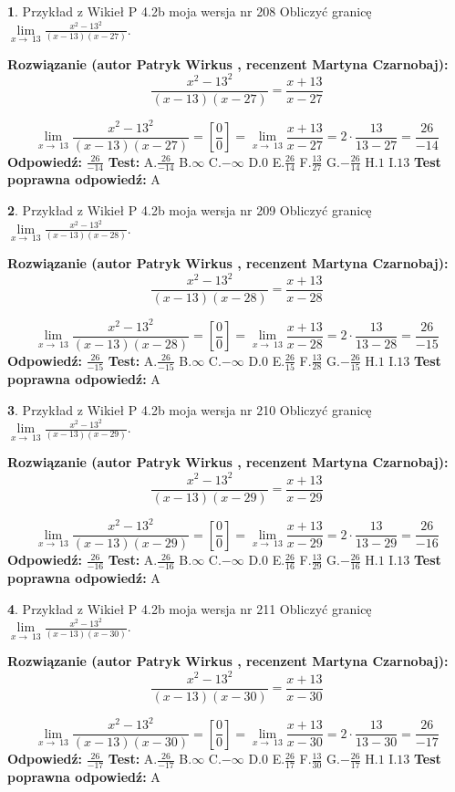 \documentclass[12pt, a4paper]{article}
\theoremstyle{definition} %
\newtheorem{zad}{}
\newcommand{\zadStart}[1]{\begin{zad}#1\newline}
\newcommand{\zadStop}{\end{zad}}
\newcommand{\rozwStart}[2]{\noindent \textbf{Rozwiązanie (autor #1 , recenzent #2): }\newline}
\newcommand{\rozwStop}{\newline}
\newcommand{\odpStart}{\noindent \textbf{Odpowiedź:}\newline}
\newcommand{\odpStop}{\newline}
\newcommand{\testStart}{\noindent \textbf{Test:}\newline}
\newcommand{\testStop}{\newline}
\newcommand{\kluczStart}{\noindent \textbf{Test poprawna odpowiedź:}\newline}
\newcommand{\kluczStop}{\newline}
\begin{document}
\zadStart{Przykład z Wikieł P 4.2b moja wersja nr 208}
Obliczyć granicę $\lim\limits_{x\to\ 13}\frac{x^{2}-13^{2}}{(x-13)(x-27)}$.
\zadStop
\rozwStart{Patryk Wirkus}{Martyna Czarnobaj}
$$\frac{x^{2}-13^{2}}{(x-13)(x-27)}=\frac{x+13}{x-27}$$

$$\lim\limits_{x\to\ 13}\frac{x^{2}-13^{2}}{(x-13)(x-27)}=[\frac{0}{0}]=\lim\limits_{x\to\ 13}\frac{x+13}{x-27}=2 \cdot \frac{13}{13-27} = \frac{26}{-14}$$
\rozwStop
\odpStart
$\frac{26}{-14}$
\odpStop
\testStart
A.$\frac{26}{-14}$
B.$\infty$
C.$-\infty$
D.$0$
E.$\frac{26}{14}$
F.$\frac{13}{27}$
G.$-\frac{26}{14}$
H.$1$
I.$13$
\testStop
\kluczStart
A
\kluczStop



\zadStart{Przykład z Wikieł P 4.2b moja wersja nr 209}
Obliczyć granicę $\lim\limits_{x\to\ 13}\frac{x^{2}-13^{2}}{(x-13)(x-28)}$.
\zadStop
\rozwStart{Patryk Wirkus}{Martyna Czarnobaj}
$$\frac{x^{2}-13^{2}}{(x-13)(x-28)}=\frac{x+13}{x-28}$$

$$\lim\limits_{x\to\ 13}\frac{x^{2}-13^{2}}{(x-13)(x-28)}=[\frac{0}{0}]=\lim\limits_{x\to\ 13}\frac{x+13}{x-28}=2 \cdot \frac{13}{13-28} = \frac{26}{-15}$$
\rozwStop
\odpStart
$\frac{26}{-15}$
\odpStop
\testStart
A.$\frac{26}{-15}$
B.$\infty$
C.$-\infty$
D.$0$
E.$\frac{26}{15}$
F.$\frac{13}{28}$
G.$-\frac{26}{15}$
H.$1$
I.$13$
\testStop
\kluczStart
A
\kluczStop



\zadStart{Przykład z Wikieł P 4.2b moja wersja nr 210}
Obliczyć granicę $\lim\limits_{x\to\ 13}\frac{x^{2}-13^{2}}{(x-13)(x-29)}$.
\zadStop
\rozwStart{Patryk Wirkus}{Martyna Czarnobaj}
$$\frac{x^{2}-13^{2}}{(x-13)(x-29)}=\frac{x+13}{x-29}$$

$$\lim\limits_{x\to\ 13}\frac{x^{2}-13^{2}}{(x-13)(x-29)}=[\frac{0}{0}]=\lim\limits_{x\to\ 13}\frac{x+13}{x-29}=2 \cdot \frac{13}{13-29} = \frac{26}{-16}$$
\rozwStop
\odpStart
$\frac{26}{-16}$
\odpStop
\testStart
A.$\frac{26}{-16}$
B.$\infty$
C.$-\infty$
D.$0$
E.$\frac{26}{16}$
F.$\frac{13}{29}$
G.$-\frac{26}{16}$
H.$1$
I.$13$
\testStop
\kluczStart
A
\kluczStop



\zadStart{Przykład z Wikieł P 4.2b moja wersja nr 211}
Obliczyć granicę $\lim\limits_{x\to\ 13}\frac{x^{2}-13^{2}}{(x-13)(x-30)}$.
\zadStop
\rozwStart{Patryk Wirkus}{Martyna Czarnobaj}
$$\frac{x^{2}-13^{2}}{(x-13)(x-30)}=\frac{x+13}{x-30}$$

$$\lim\limits_{x\to\ 13}\frac{x^{2}-13^{2}}{(x-13)(x-30)}=[\frac{0}{0}]=\lim\limits_{x\to\ 13}\frac{x+13}{x-30}=2 \cdot \frac{13}{13-30} = \frac{26}{-17}$$
\rozwStop
\odpStart
$\frac{26}{-17}$
\odpStop
\testStart
A.$\frac{26}{-17}$
B.$\infty$
C.$-\infty$
D.$0$
E.$\frac{26}{17}$
F.$\frac{13}{30}$
G.$-\frac{26}{17}$
H.$1$
I.$13$
\testStop
\kluczStart
A
\kluczStop
\end{document}
